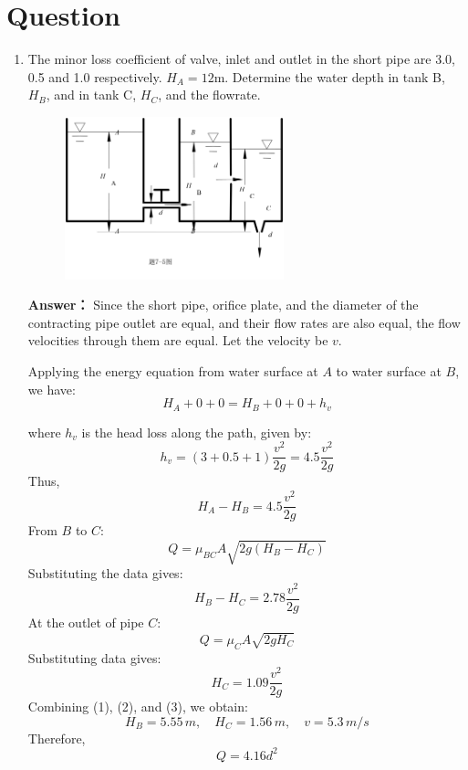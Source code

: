 \documentclass[12pt,a4paper]{article}
\newcounter{question}
\newenvironment{questions}{
    \setcounter{question}{0}
    \section*{Question}
    \begin{enumerate}[leftmargin=1.5em,label={\arabic*．}]
}{
    \end{enumerate}
}
\newcommand{\answer}[1]{\par\noindent\textbf{Answer：} #1\par\vspace{1em}}
\begin{document}
\begin{questions}
{For the new pipe:
\[
\frac{P_1}{\gamma} + z_1 + \frac{V_1^2}{2g} = \frac{P_2}{\gamma} + z_2 + \frac{V_2^2}{2g} + f \frac{L_1}{D} \frac{V_2^2}{2g} + f \frac{L_2}{D} \frac{V_2^2}{2g}
\]
and calculate it:
\[
25 = 0.02 \frac{600}{0.5} \frac{7.85^2}{2 \times 32.2} + 0.02 \times \frac{500}{D} \times \frac{V_2^2}{2 \times 32.2}
\]
we get one equation:
\[
\frac{v_3^2}{D'}=13.1
\]
and by the continuous equation:
\[
Q_1' = Q_2 + Q_3
\]
we can obtain the second equation:
\[
D'^2v_3=1.32
\]
so the answer is that $v_3 =2.95ft/s$, and $D' = 0.66ft$.
}

\item The minor loss coefficient of valve, inlet and outlet in the short pipe are 3.0, 0.5 and 1.0 respectively. \( H_A = 12 \)m. Determine the water depth in tank B, \( H_B \), and in tank C, \( H_C \), and the flowrate.

\begin{figure}[H]
\centering
\includegraphics[width=0.6\textwidth]{./figures/26.png}
\end{figure}

\answer{
Since the short pipe, orifice plate, and the diameter of the contracting pipe outlet are equal, and their flow rates are also equal, the flow velocities through them are equal. Let the velocity be \( v \).

Applying the energy equation from water surface at \( A \) to water surface at \( B \), we have:
\[
H_A + 0 + 0 = H_B + 0 + 0 + h_v
\]

where \( h_v \) is the head loss along the path, given by:
\[
h_v = (3 + 0.5 + 1) \frac{v^2}{2g} = 4.5 \frac{v^2}{2g}
\]
Thus,
\[
H_A - H_B = 4.5 \frac{v^2}{2g} 
\]
From \( B \) to \( C \):
\[
Q = \mu_{BC} A \sqrt{2g(H_B - H_C)}
\]
Substituting the data gives:
\[
H_B - H_C = 2.78 \frac{v^2}{2g} 
\]
At the outlet of pipe \( C \):
\[
Q = \mu_C A \sqrt{2g H_C}
\]
Substituting data gives:
\[
H_C = 1.09 \frac{v^2}{2g} 
\]
Combining (1), (2), and (3), we obtain:
\[
H_B = 5.55\,m, \quad H_C = 1.56\,m, \quad v = 5.3\,m/s
\]
Therefore,
\[
Q = 4.16 d^2
\]

}
\end{questions}
\end{document}
